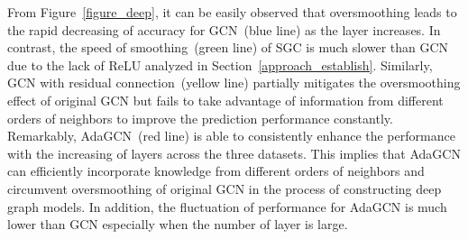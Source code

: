 \documentclass{article} \usepackage{iclr2021_conference,times}
\begin{document}
From Figure~\ref{figure_deep}, it can be easily observed that oversmoothing leads to the rapid decreasing of accuracy for GCN~(blue line) as the layer increases. In contrast, the speed of smoothing~(green line) of SGC is much slower than GCN due to the lack of ReLU analyzed in Section~\ref{approach_establish}. Similarly, GCN with residual connection~(yellow line) partially mitigates the oversmoothing effect of original GCN but fails to take advantage of information from different orders of neighbors to improve the prediction performance constantly. Remarkably, AdaGCN~(red line) is able to consistently enhance the performance with the increasing of layers across the three datasets. This implies that AdaGCN can efficiently incorporate knowledge from different orders of neighbors and circumvent oversmoothing of original GCN in the process of constructing deep graph models. In addition, the fluctuation of performance for AdaGCN is much lower than GCN especially when the number of layer is large.



\begin{table}[t!]
	\centering
	\caption{Average accuracy across different label rates with 20 splittings of datasets under 100 runs.}
	\label{table_labelrate}
\end{table}
\end{document}
